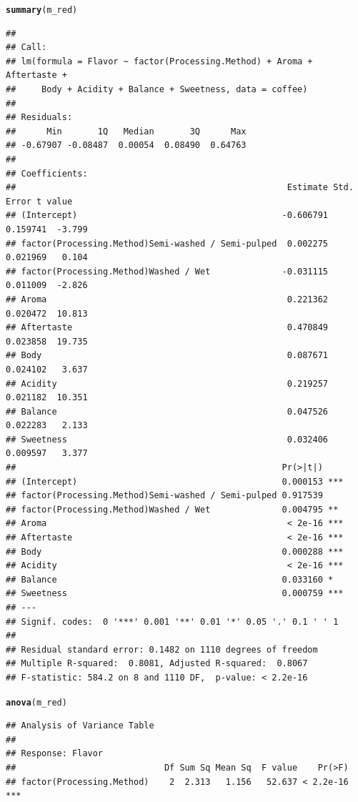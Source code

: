 \documentclass[oneside]{book}\usepackage[]{graphicx}\usepackage[dvipsnames,table,xcdraw]{xcolor}
\makeatletter
\newcommand{\hlstd}[1]{\textcolor[rgb]{0.345,0.345,0.345}{#1}}%
\newcommand{\hlkwd}[1]{\textcolor[rgb]{0.737,0.353,0.396}{\textbf{#1}}}%
\newenvironment{kframe}{%
 \def\at@end@of@kframe{}%
 \ifinner\ifhmode%
  \def\at@end@of@kframe{\end{minipage}}%
  \begin{minipage}{\columnwidth}%
 \fi\fi%
 \def\FrameCommand##1{\hskip\@totalleftmargin \hskip-\fboxsep
 \colorbox{shadecolor}{##1}\hskip-\fboxsep
     \hskip-\linewidth \hskip-\@totalleftmargin \hskip\columnwidth}%
 \MakeFramed {\advance\hsize-\width
   \@totalleftmargin\z@ \linewidth\hsize
   \@setminipage}}%
 {\par\unskip\endMakeFramed%
 \at@end@of@kframe}
\newenvironment{knitrout}{}{} %
\makeatother
\begin{document}
\begin{knitrout}
\begin{kframe}
\begin{alltt}
\hlkwd{summary}\hlstd{(m_red)}
\end{alltt}
\begin{verbatim}
## 
## Call:
## lm(formula = Flavor ~ factor(Processing.Method) + Aroma + Aftertaste + 
##     Body + Acidity + Balance + Sweetness, data = coffee)
## 
## Residuals:
##      Min       1Q   Median       3Q      Max 
## -0.67907 -0.08487  0.00054  0.08490  0.64763 
## 
## Coefficients:
##                                                     Estimate Std. Error t value
## (Intercept)                                        -0.606791   0.159741  -3.799
## factor(Processing.Method)Semi-washed / Semi-pulped  0.002275   0.021969   0.104
## factor(Processing.Method)Washed / Wet              -0.031115   0.011009  -2.826
## Aroma                                               0.221362   0.020472  10.813
## Aftertaste                                          0.470849   0.023858  19.735
## Body                                                0.087671   0.024102   3.637
## Acidity                                             0.219257   0.021182  10.351
## Balance                                             0.047526   0.022283   2.133
## Sweetness                                           0.032406   0.009597   3.377
##                                                    Pr(>|t|)    
## (Intercept)                                        0.000153 ***
## factor(Processing.Method)Semi-washed / Semi-pulped 0.917539    
## factor(Processing.Method)Washed / Wet              0.004795 ** 
## Aroma                                               < 2e-16 ***
## Aftertaste                                          < 2e-16 ***
## Body                                               0.000288 ***
## Acidity                                             < 2e-16 ***
## Balance                                            0.033160 *  
## Sweetness                                          0.000759 ***
## ---
## Signif. codes:  0 '***' 0.001 '**' 0.01 '*' 0.05 '.' 0.1 ' ' 1
## 
## Residual standard error: 0.1482 on 1110 degrees of freedom
## Multiple R-squared:  0.8081,	Adjusted R-squared:  0.8067 
## F-statistic: 584.2 on 8 and 1110 DF,  p-value: < 2.2e-16
\end{verbatim}
\begin{alltt}
\hlkwd{anova}\hlstd{(m_red)}
\end{alltt}
\begin{verbatim}
## Analysis of Variance Table
## 
## Response: Flavor
##                             Df Sum Sq Mean Sq  F value    Pr(>F)    
## factor(Processing.Method)    2  2.313   1.156   52.637 < 2.2e-16 ***

\end{verbatim}
\end{kframe}
\end{knitrout}
\end{document}
